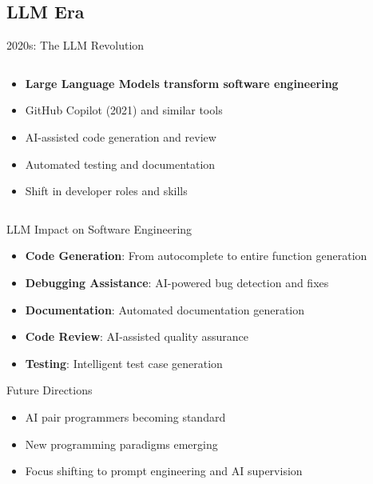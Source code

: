 \documentclass{beamer}
\begin{document}
\subsection{LLM Era}

\begin{frame}[t]{2020s: The LLM Revolution}
\begin{columns}
    \begin{column}{0.6\textwidth}
        \begin{itemize}
            \item \textbf{Large Language Models transform software engineering}
            \item GitHub Copilot (2021) and similar tools
            \item AI-assisted code generation and review
            \item Automated testing and documentation
            \item Shift in developer roles and skills
        \end{itemize}
    \end{column}
    \begin{column}{0.4\textwidth}
    \end{column}
\end{columns}
\end{frame}

\begin{frame}[t]{LLM Impact on Software Engineering}
\begin{itemize}
    \item \textbf{Code Generation}: From autocomplete to entire function generation
    \item \textbf{Debugging Assistance}: AI-powered bug detection and fixes
    \item \textbf{Documentation}: Automated documentation generation
    \item \textbf{Code Review}: AI-assisted quality assurance
    \item \textbf{Testing}: Intelligent test case generation
\end{itemize}
\begin{block}{Future Directions}
\begin{itemize}
    \item AI pair programmers becoming standard
    \item New programming paradigms emerging
    \item Focus shifting to prompt engineering and AI supervision
\end{itemize}
\end{block}
\end{frame}
\end{document}

